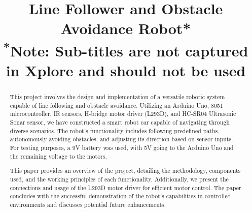\documentclass[conference]{IEEEtran}
\begin{document}
\title{Line Follower and Obstacle Avoidance Robot*\\
{\footnotesize \textsuperscript{*}Note: Sub-titles are not captured in Xplore and should not be used}
}

\author{
\and
{}
\and
{}
}

\maketitle

\begin{abstract}
This project involves the design and implementation of a versatile robotic system capable of line following and obstacle avoidance. Utilizing an Arduino Uno, 8051 microcontroller, IR sensors, H-bridge motor driver (L293D), and HC-SR04 Ultrasonic Sonar sensor, we have constructed a smart robot car capable of navigating through diverse scenarios. The robot's functionality includes following predefined paths, autonomously avoiding obstacles, and adjusting its direction based on sensor inputs. For testing purposes, a 9V battery was used, with 5V going to the Arduino Uno and the remaining voltage to the motors.

This paper provides an overview of the project, detailing the methodology, components used, and the working principles of each functionality. Additionally, we present the connections and usage of the L293D motor driver for efficient motor control. The paper concludes with the successful demonstration of the robot's capabilities in controlled environments and discusses potential future enhancements.

\end{abstract}
\end{document}
